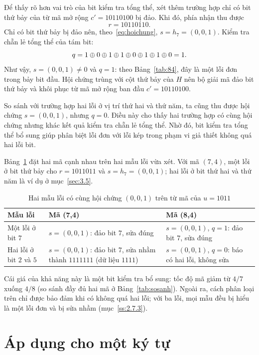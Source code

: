 Để thấy rõ hơn vai trò của bit kiểm tra tổng thể, xét thêm trường hợp chỉ có
bit thứ bảy của từ mã mở rộng $c' = 10110100$ bị đảo. Khi đó, phía nhận thu được
\[
  r = 10110110 .
\]
Chỉ có bit thứ bảy bị đảo nên, theo~\eqref{eq:hoichung},
$s = h_7 = (0,0,1)$. Kiểm tra chẵn lẻ tổng thể của tám bit:
\[
  q = 1 \oplus 0 \oplus 1 \oplus 1 \oplus 0 \oplus 1 \oplus 1 \oplus 0 = 1 .
\]
Như vậy, $s = (0,0,1) \neq 0$ và $q = 1$: theo Bảng~\ref{tab:84}, đây là một lỗi
đơn trong bảy bit đầu. Hội chứng trùng với cột thứ bảy của $H$ nên bộ giải mã
đảo bit thứ bảy và khôi phục từ mã mở rộng ban đầu $c' = 10110100$.

So sánh với trường hợp hai lỗi ở vị trí thứ hai và thứ năm, ta cũng thu được hội
chứng $s = (0,0,1)$, nhưng $q = 0$. Điều này cho thấy hai trường hợp có cùng hội
chứng nhưng khác kết quả kiểm tra chẵn lẻ tổng thể. Nhờ đó, bit kiểm tra tổng
thể bổ sung giúp phân biệt lỗi đơn với lỗi kép trong phạm vi giả thiết không
quá hai lỗi bit.

Bảng~\ref{tab:haima} đặt hai mã cạnh nhau trên hai mẫu lỗi vừa xét. Với mã
$(7,4)$, một lỗi ở bit thứ bảy cho $r = 1011011$ và $s = h_7 = (0,0,1)$; hai lỗi
ở bit thứ hai và thứ năm là ví dụ ở mục~\ref{sec:3.5}.

\begin{table}[H]
\centering\small\renewcommand{\arraystretch}{1.1}
\caption{Hai mẫu lỗi có cùng hội chứng $(0,0,1)$ trên từ mã của $u = 1011$}
\label{tab:haima}
\begin{tabular}{|l|p{5.3cm}|p{5.3cm}|}
\hline
\textbf{Mẫu lỗi} & \textbf{Mã (7,4)} & \textbf{Mã (8,4)}\\ \hline
Một lỗi ở bit $7$ &
  $s = (0,0,1)$: đảo bit $7$, sửa đúng &
  $s = (0,0,1)$, $q = 1$: đảo bit $7$, sửa đúng\\ \hline
Hai lỗi ở bit $2$ và $5$ &
  $s = (0,0,1)$: đảo bit $7$, sửa nhầm thành $1111111$ (dữ liệu $1111$) &
  $s = (0,0,1)$, $q = 0$: báo có hai lỗi, không sửa\\ \hline
\end{tabular}
\end{table}

Cái giá của khả năng này là một bit kiểm tra bổ sung: tốc độ mã giảm từ $4/7$
xuống $4/8$ (so sánh đầy đủ hai mã ở Bảng~\ref{tab:sosanh}). Ngoài ra, cách phân
loại trên chỉ được bảo đảm khi có không quá hai lỗi; với ba lỗi, mọi mẫu đều bị
hiểu là một lỗi đơn và bị sửa nhầm (mục~\ref{ss:2.7.3}).

\section{Áp dụng cho một ký tự}
\label{sec:3.7}

